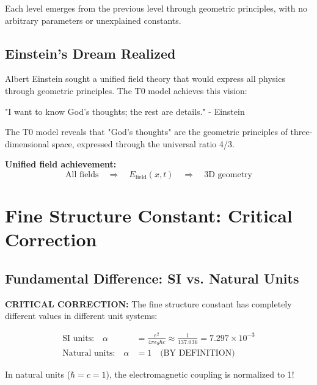 \documentclass[12pt,a4paper]{report}
\begin{document}
Each level emerges from the previous level through geometric principles, with no arbitrary parameters or unexplained constants.

\subsection{Einstein's Dream Realized}
\label{subsec:einstein_dream}

Albert Einstein sought a unified field theory that would express all physics through geometric principles. The T0 model achieves this vision:

\begin{tcolorbox}[colback=green!5!white,colframe=green!75!black,title=Einstein's Vision Realized]
	"I want to know God's thoughts; the rest are details." - Einstein
	
	The T0 model reveals that "God's thoughts" are the geometric principles of three-dimensional space, expressed through the universal ratio 4/3.
\end{tcolorbox}

\textbf{Unified field achievement:}
\begin{equation}
	\text{All fields} \quad \Rightarrow \quad E_{\text{field}}(x,t) \quad \Rightarrow \quad \text{3D geometry}
\end{equation}

\section{Fine Structure Constant: Critical Correction}
\label{sec:fine_structure_correction}

\subsection{Fundamental Difference: SI vs. Natural Units}
\label{subsec:si_vs_natural_units}

\textbf{CRITICAL CORRECTION:} The fine structure constant has completely different values in different unit systems:

\begin{tcolorbox}[colback=red!10!white,colframe=red!75!black,title=CRITICAL POINT]
	\begin{align}
		\text{SI units:} \quad \alpha &= \frac{e^2}{4\pi\epsilon_0\hbar c} \approx \frac{1}{137.036} = 7.297 \times 10^{-3} \\
		\text{Natural units:} \quad \alpha &= 1 \quad \text{(BY DEFINITION)}
	\end{align}
	
	In natural units ($\hbar = c = 1$), the electromagnetic coupling is normalized to 1!
\end{tcolorbox}
\end{document}
